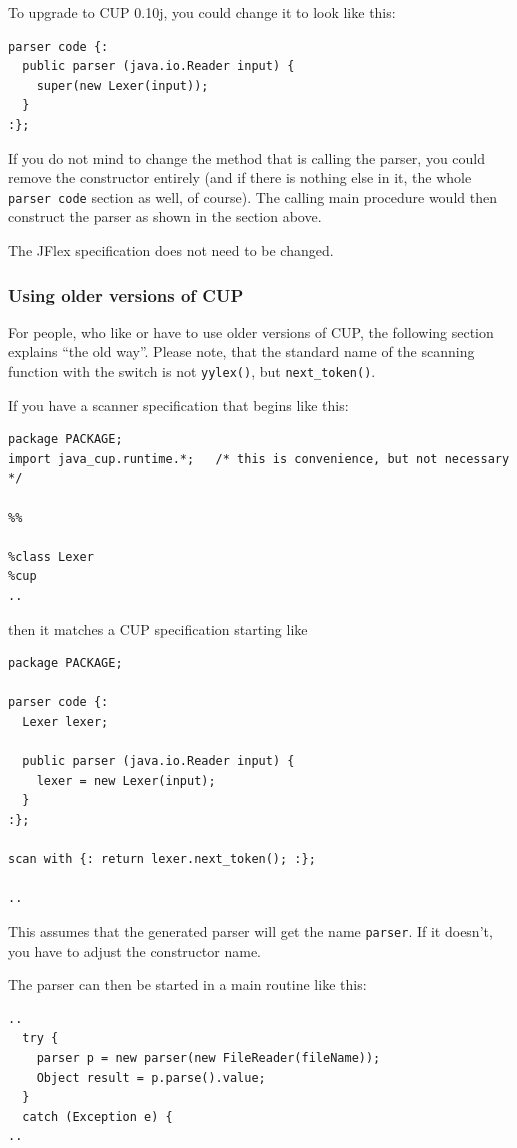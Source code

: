 \documentclass[11pt]{scrartcl}
\newcommand{\xsmall}{}
\begin{document}
To upgrade to CUP 0.10j, you could change it to look like this:
{\xsmall\begin{verbatim}
parser code {:
  public parser (java.io.Reader input) {
    super(new Lexer(input));
  }
:};
\end{verbatim}
}

If you do not mind to change the method that is calling the parser,
you could remove the constructor entirely (and if there is nothing else
in it, the whole \texttt{parser code} section as well, of course). The calling
main procedure would then construct the parser as shown in the section above.

The JFlex specification does not need to be changed.

\subsubsection{Using older versions of CUP}
For people, who like or have to use older versions of CUP, the following section 
explains ``the old way''. Please note, that the standard name of the scanning 
function with the \texttt{} switch is not 
\texttt{yylex()}, but \texttt{next\_token()}.

If you have a scanner specification that begins like this:

{\xsmall\begin{verbatim}
package PACKAGE;
import java_cup.runtime.*;   /* this is convenience, but not necessary */
 
%%
 
%class Lexer
%cup
..
\end{verbatim}
}

then it matches a CUP specification starting  like

{\xsmall\begin{verbatim}
package PACKAGE;

parser code {:
  Lexer lexer;

  public parser (java.io.Reader input) {
    lexer = new Lexer(input);
  }
:};

scan with {: return lexer.next_token(); :};

..
\end{verbatim}
}

This assumes that the generated parser will get the name \texttt{parser}.
If it doesn't, you have to adjust the constructor name.

The parser can then be started in a main routine like this:

{\xsmall\begin{verbatim}
..
  try {
    parser p = new parser(new FileReader(fileName));
    Object result = p.parse().value; 
  }
  catch (Exception e) {
..
\end{verbatim} 
}
\end{document}
